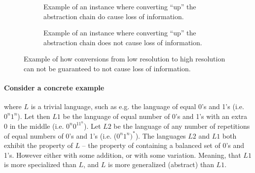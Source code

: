 \documentclass{scrreprt}
\begin{document}
\begin{figure}[h]

\begin{subfigure}{.5\textwidth}
  \centering

  \caption{Example of an instance where converting ``up'' the abstraction chain do cause loss of information.}
  \label{fig:low-to-high-resolution-destructive}
\end{subfigure}%
\begin{subfigure}{.5\textwidth}
  \centering

  \caption{Example of an instance where converting ``up'' the abstraction chain does not cause loss of information.}
  \label{fig:low-to-high-resolution-non-destructive}
\end{subfigure}

\caption{Example of how conversions from low resolution to high resolution can not be guaranteed to not cause loss of information.}
\end{figure}


\color{red}


\paragraph{Consider a concrete example} where $L$ is a trivial language, such as e.g. the language of equal 0's and 1's (i.e. $0^n1^n$). Let then $L1$ be the language of equal number of 0's and 1's with an extra 0 in the middle (i.e. $0^n0^11^n$). Let $L2$ be the language of any number of repetitions of equal numbers of 0's and 1's (i.e. ($0^n1^n)^*$). The languages $L2$ and $L1$ both exhibit the property of $L$ -- the property of containing a balanced set of 0's and 1's. However either with some addition, or with some variation. Meaning, that $L1$ is more specialized than $L$, and $L$ is more generalized (abstract) than $L1$.
\end{document}
